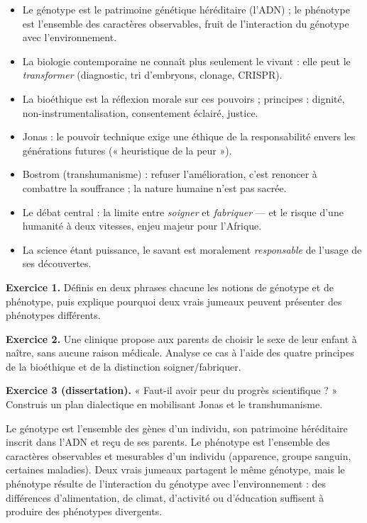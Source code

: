 \documentclass[11pt]{article}
\newcommand{\cle}[1]{{\popxbold\color{popdark}#1}}
\begin{document}
\begin{aretenir}
\begin{itemize}
\item Le \cle{génotype} est le patrimoine génétique héréditaire (l'ADN) ; le \cle{phénotype} est l'ensemble des caractères observables, fruit de l'interaction du génotype avec l'environnement.
\item La biologie contemporaine ne connaît plus seulement le vivant : elle peut le \emph{transformer} (diagnostic, tri d'embryons, clonage, CRISPR).
\item La \cle{bioéthique} est la réflexion morale sur ces pouvoirs ; principes : dignité, non-instrumentalisation, consentement éclairé, justice.
\item \cle{Jonas} : le pouvoir technique exige une éthique de la responsabilité envers les générations futures (« heuristique de la peur »).
\item \cle{Bostrom} (transhumanisme) : refuser l'amélioration, c'est renoncer à combattre la souffrance ; la nature humaine n'est pas sacrée.
\item Le débat central : la limite entre \emph{soigner} et \emph{fabriquer} — et le risque d'une humanité à deux vitesses, enjeu majeur pour l'Afrique.
\item La science étant puissance, le savant est moralement \emph{responsable} de l'usage de ses découvertes.
\end{itemize}
\end{aretenir}

\begin{exercice}
\textbf{Exercice 1.} Définis en deux phrases chacune les notions de génotype et de phénotype, puis explique pourquoi deux vrais jumeaux peuvent présenter des phénotypes différents.

\textbf{Exercice 2.} Une clinique propose aux parents de choisir le sexe de leur enfant à naître, sans aucune raison médicale. Analyse ce cas à l'aide des quatre principes de la bioéthique et de la distinction soigner/fabriquer.

\textbf{Exercice 3 (dissertation).} « Faut-il avoir peur du progrès scientifique ? » Construis un plan dialectique en mobilisant Jonas et le transhumanisme.
\end{exercice}

\begin{corrige}[Exercice 1]
Le génotype est l'ensemble des gènes d'un individu, son patrimoine héréditaire inscrit dans l'ADN et reçu de ses parents. Le phénotype est l'ensemble des caractères observables et mesurables d'un individu (apparence, groupe sanguin, certaines maladies). Deux vrais jumeaux partagent le même génotype, mais le phénotype résulte de l'interaction du génotype avec l'environnement : des différences d'alimentation, de climat, d'activité ou d'éducation suffisent à produire des phénotypes divergents.
\end{corrige}
\end{document}

